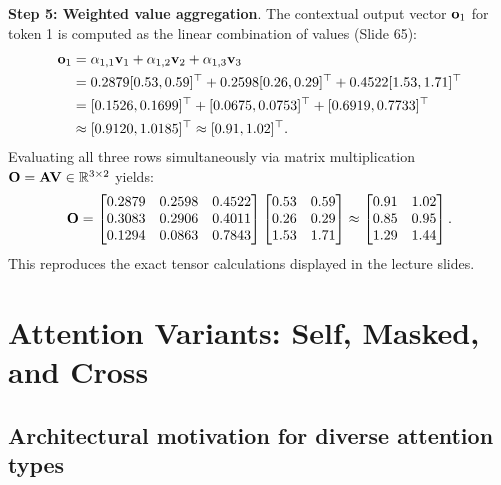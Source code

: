 \documentclass[../../main.tex]{subfiles}
\begin{document}
\noindent\textbf{Step 5: Weighted value aggregation}.\newline
The contextual output vector $\mathbf{o}_1$ for token 1 is computed as the linear combination of values (Slide 65):
\begin{equation}
\label{eq:vo1_numerical_calc}
\begin{aligned}
\mathbf{o}_1 &= \alpha_{1,1} \mathbf{v}_1 + \alpha_{1,2} \mathbf{v}_2 + \alpha_{1,3} \mathbf{v}_3 \\
&= 0.2879 [0.53, 0.59]^\top + 0.2598 [0.26, 0.29]^\top + 0.4522 [1.53, 1.71]^\top \\
&= [0.1526, 0.1699]^\top + [0.0675, 0.0753]^\top + [0.6919, 0.7733]^\top \\
&\approx [0.9120, 1.0185]^\top \approx [0.91, 1.02]^\top.
\end{aligned}
\end{equation}
Evaluating all three rows simultaneously via matrix multiplication $\mathbf{O} = \mathbf{A} \mathbf{V} \in \mathbb{R}^{3 \times 2}$ yields:
\begin{equation}
\label{eq:matrix_output_numerical_ch5}
\mathbf{O} = \begin{bmatrix}
0.2879 & 0.2598 & 0.4522 \\
0.3083 & 0.2906 & 0.4011 \\
0.1294 & 0.0863 & 0.7843
\end{bmatrix}
\begin{bmatrix}
0.53 & 0.59 \\
0.26 & 0.29 \\
1.53 & 1.71
\end{bmatrix}
\approx \begin{bmatrix}
0.91 & 1.02 \\
0.85 & 0.95 \\
1.29 & 1.44
\end{bmatrix}.
\end{equation}
This reproduces the exact tensor calculations displayed in the lecture slides.

\clearpage
\section{Attention Variants: Self, Masked, and Cross}
\label{sec:attention_types_architectures}

\subsection{Architectural motivation for diverse attention types}
\label{subsec:why_attention_triad}
\end{document}
